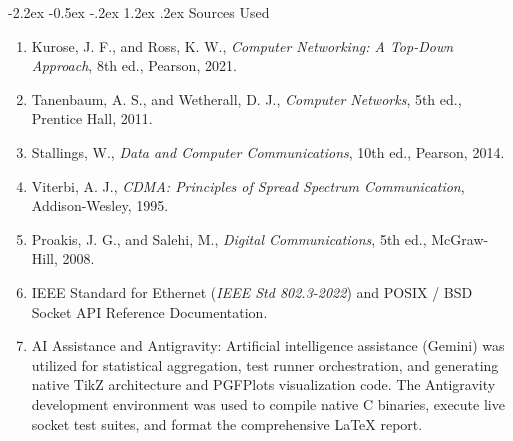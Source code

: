 \documentclass[11pt,a4paper]{article}
\makeatletter
\renewcommand\section{\@startsection {section}{1}{\z@}%
                                   {-2.2ex \@plus -0.5ex \@minus -.2ex}%
                                   {1.2ex \@plus.2ex}%
                                   {\normalfont\Large\bfseries}}
\makeatother
\begin{document}
\section{Sources Used}
\begin{enumerate}
    \item Kurose, J. F., and Ross, K. W., \textit{Computer Networking: A Top-Down Approach}, 8th ed., Pearson, 2021.
    \item Tanenbaum, A. S., and Wetherall, D. J., \textit{Computer Networks}, 5th ed., Prentice Hall, 2011.
    \item Stallings, W., \textit{Data and Computer Communications}, 10th ed., Pearson, 2014.
    \item Viterbi, A. J., \textit{CDMA: Principles of Spread Spectrum Communication}, Addison-Wesley, 1995.
    \item Proakis, J. G., and Salehi, M., \textit{Digital Communications}, 5th ed., McGraw-Hill, 2008.
    \item IEEE Standard for Ethernet (\textit{IEEE Std 802.3-2022}) and POSIX / BSD Socket API Reference Documentation.
    \item AI Assistance and Antigravity: Artificial intelligence assistance (Gemini) was utilized for statistical aggregation, test runner orchestration, and generating native TikZ architecture and PGFPlots visualization code. The Antigravity development environment was used to compile native C binaries, execute live socket test suites, and format the comprehensive \LaTeX{} report.
\end{enumerate}
\end{document}
